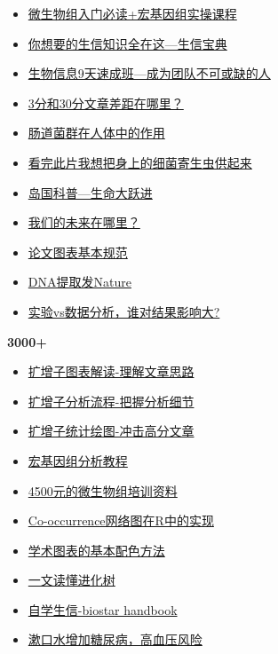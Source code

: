 \documentclass[]{article}
\providecommand{\tightlist}{%
  \setlength{\itemsep}{0pt}\setlength{\parskip}{0pt}}
\numberwithin{figure}{section}
\numberwithin{table}{section}
\begin{document}
\begin{itemize}
\tightlist
\item
  \href{http://mp.weixin.qq.com/s/sQyl5EctXFB95Oxg8YIasg}{微生物组入门必读+宏基因组实操课程}
\item
  \href{http://mp.weixin.qq.com/s/2b3_8Vvv7McqCkEfUszW3A}{你想要的生信知识全在这---生信宝典}
\item
  \href{http://mp.weixin.qq.com/s/1nf7vwyvC3oemkTq_pu87A}{生物信息9天速成班---成为团队不可或缺的人}
\item
  \href{http://mp.weixin.qq.com/s/kD-x7K4hI5KMgGXikyLt0Q}{3分和30分文章差距在哪里？}
\item
  \href{http://mp.weixin.qq.com/s/3T768LA6MWujF4yuzK4MKQ}{肠道菌群在人体中的作用}
\item
  \href{http://mp.weixin.qq.com/s/_DUI6tOYTEq0Wu7K7iRTxw}{看完此片我想把身上的细菌寄生虫供起来}
\item
  \href{http://mp.weixin.qq.com/s/O_0Il0G_v_aSwkUH_noZVA}{岛国科普---生命大跃进}
\item
  \href{https://mp.weixin.qq.com/s/l141ggt2c-h7Eymc0UQnfQ}{我们的未来在哪里？}
\item
  \href{http://mp.weixin.qq.com/s/SCT4oso_vI0UNIJZTaG95g}{论文图表基本规范}
\item
  \href{http://mp.weixin.qq.com/s/lO5uiMjixJ6aYTjPX-IyaQ}{DNA提取发Nature}
\item
  \href{http://mp.weixin.qq.com/s/cL_IAoPFfmelKMPMgltrfA}{实验vs数据分析，谁对结果影响大?}
\end{itemize}

\textbf{3000+}

\begin{itemize}
\tightlist
\item
  \href{http://mp.weixin.qq.com/s/oiVHO2S1JgYrKXPDU6fH2g}{扩增子图表解读-理解文章思路}
\item
  \href{http://mp.weixin.qq.com/s/KrYyy3jjzAL0rQzVfV6h4A}{扩增子分析流程-把握分析细节}
\item
  \href{http://mp.weixin.qq.com/s/6tNePiaDsPPzEBZjiCXIRg}{扩增子统计绘图-冲击高分文章}
\item
  \href{http://mp.weixin.qq.com/s/bcyvhFrNr6niqD13rQfZeg}{宏基因组分析教程}
\item
  \href{http://mp.weixin.qq.com/s/li7SdZVaCEyFQF8h6MMh2A}{4500元的微生物组培训资料}
\item
  \href{http://mp.weixin.qq.com/s/s-Si_s5pk7EF5gueqruBRQ}{Co-occurrence网络图在R中的实现}
\item
  \href{http://mp.weixin.qq.com/s/hq5p8Lqzn9Km2qVRLW2dVQ}{学术图表的基本配色方法}
\item
  \href{https://mp.weixin.qq.com/s/GV8rU3FZdc8Y-x931k_yrQ}{一文读懂进化树}
\item
  \href{http://mp.weixin.qq.com/s/JL-n2nD6YL8vwuRtTVmQlQ}{自学生信-biostar handbook}
\item
  \href{http://mp.weixin.qq.com/s/NxNcDljhyvubbYzVgggHfw}{漱口水增加糖尿病，高血压风险}
\end{itemize}
\end{document}
